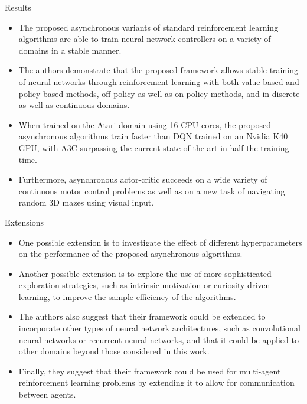 \documentclass[aspectratio=169]{beamer}
\begin{document}
\begin{frame}[label={sec:org634a561}]{Results}
\begin{itemize}
\item The proposed asynchronous variants of standard reinforcement learning algorithms are able to train neural network controllers on a variety of domains in a stable manner.
\item The authors demonstrate that the proposed framework allows stable training of neural networks through reinforcement learning with both value-based and policy-based methods, off-policy as well as on-policy methods, and in discrete as well as continuous domains.
\item When trained on the Atari domain using 16 CPU cores, the proposed asynchronous algorithms train faster than DQN trained on an Nvidia K40 GPU, with A3C surpassing the current state-of-the-art in half the training time.
\item Furthermore, asynchronous actor-critic succeeds on a wide variety of continuous motor control problems as well as on a new task of navigating random 3D mazes using visual input.
\end{itemize}
\end{frame}
\begin{frame}[label={sec:orgea816bf}]{Extensions}
\begin{itemize}
\item One possible extension is to investigate the effect of different hyperparameters on the performance of the proposed asynchronous algorithms.
\item Another possible extension is to explore the use of more sophisticated exploration strategies, such as intrinsic motivation or curiosity-driven learning, to improve the sample efficiency of the algorithms.
\item The authors also suggest that their framework could be extended to incorporate other types of neural network architectures, such as convolutional neural networks or recurrent neural networks, and that it could be applied to other domains beyond those considered in this work.
\item Finally, they suggest that their framework could be used for multi-agent reinforcement learning problems by extending it to allow for communication between agents.
\end{itemize}
\end{frame}
\end{document}

